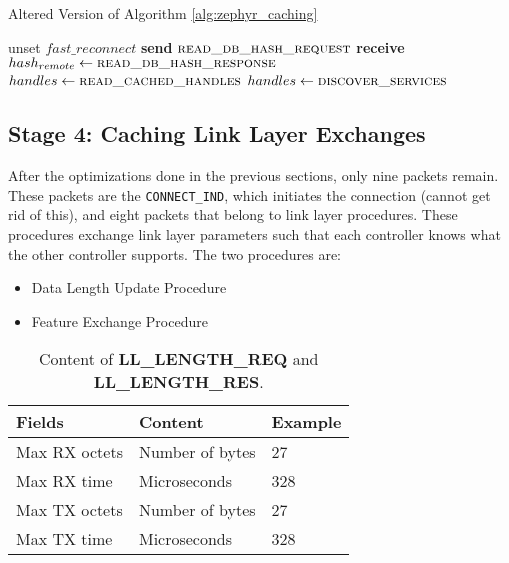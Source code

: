 \begin{algorithm}
    \caption{Altered Version of Algorithm \ref{alg:zephyr_caching}}
    \label{alg:zephyr_caching_ccc}
    \begin{algorithmic}[1] 
                \State unset $fast\_reconnect$
                \State \Return
            \EndIf
            \State \textbf{send} $\Call{read\_db\_hash\_request}{}$
            \State \textbf{receive} $hash_{remote} \gets \Call{read\_db\_hash\_response}{}$
                    \State $handles \gets \Call{read\_cached\_handles}{}$
                    \State {}
                    \State \Return
                \EndIf
            \EndIf
            \State $handles \gets\Call{discover\_services}{}$
            \State {}
            \State {}
        \EndProcedure
    \end{algorithmic}
\end{algorithm}


\subsection{Stage 4: Caching Link Layer Exchanges}
After the optimizations done in the previous sections, only nine packets remain. These packets are the \texttt{CONNECT\_IND}, which initiates the connection (cannot get rid of this), and eight packets that belong to link layer procedures. These procedures exchange link layer parameters such that each controller knows what the other controller supports. The two procedures are:
\begin{itemize}
    \item Data Length Update Procedure
    \item Feature Exchange Procedure
\end{itemize}

\begin{table}
    \begin{center}
    \begin{tabular}{|l|l|l|}
        \hline
        \textbf{Fields} & \textbf{Content} & \textbf{Example} \\
        \hline
        Max RX octets & Number of bytes & 27 \\
        \hline
        Max RX time & Microseconds & 328 \\
        \hline
        Max TX octets & Number of bytes & 27 \\
        \hline
        Max TX time & Microseconds & 328 \\
        \hline
    \end{tabular}
    \end{center}
    \caption{Content of \textbf{LL\_LENGTH\_REQ} and \textbf{LL\_LENGTH\_RES}.}
    \label{tbl:dle_packet_content}
\end{table}

